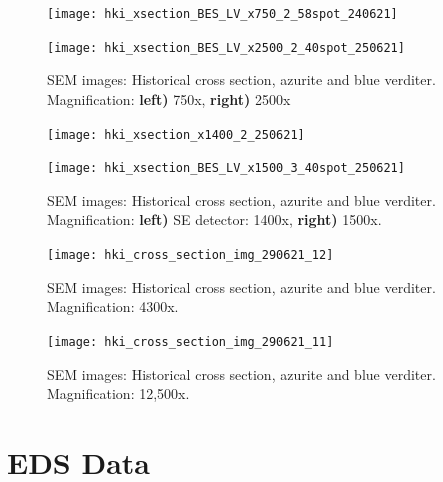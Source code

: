 \begin{figure}[H]
\centering
\begin{minipage}{.45\textwidth}
  \centering
  \texttt{[image: hki\_xsection\_BES\_LV\_x750\_2\_58spot\_240621]}     
\end{minipage}
\begin{minipage}{.45\textwidth}
  \centering
  \texttt{[image: hki\_xsection\_BES\_LV\_x2500\_2\_40spot\_250621]}    
\end{minipage}
\caption[SEM images: Historical cross section, azurite and blue verditer]{SEM images: Historical cross section, azurite and blue verditer. Magnification: \textbf{left)} 750x, \textbf{right)} 2500x}
\label{fig:xsection_jeol_1}
\end{figure}

\begin{figure}[H]
\centering
\begin{minipage}{.45\textwidth}
  \centering
  \texttt{[image: hki\_xsection\_x1400\_2\_250621]}
\end{minipage}
\begin{minipage}{.45\textwidth}
  \centering
  \texttt{[image: hki\_xsection\_BES\_LV\_x1500\_3\_40spot\_250621]}
\end{minipage}
\caption[SEM images: Historical cross section, azurite and blue verditer]{SEM images: Historical cross section, azurite and blue verditer. Magnification: \textbf{left)} SE detector: 1400x, \textbf{right)} 1500x.}
\label{fig:xsection_jeol_2}
\end{figure}

\begin{figure}[H]
\centering
  \texttt{[image: hki\_cross\_section\_img\_290621\_12]}
\caption[SEM images: Historical cross section, azurite and blue verditer]{SEM images: Historical cross section, azurite and blue verditer. Magnification: 4300x.}
\label{fig:xsection_dept_1}
\end{figure}

\begin{figure}[H]
\centering
  \texttt{[image: hki\_cross\_section\_img\_290621\_11]}
\caption[SEM images: Historical cross section, azurite and blue verditer]{SEM images: Historical cross section, azurite and blue verditer. Magnification: 12,500x.}
\label{fig:xsection_dept_2}
\end{figure}


\section[EDS Data]{EDS Data}
\label{section3.2}

